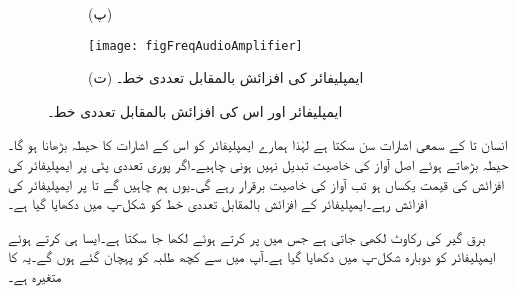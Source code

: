 \begin{figure}
\begin{subfigure}{1\textwidth}
\caption*{(پ)}
\end{subfigure}
\begin{subfigure}{1\textwidth}
\centering
\texttt{[image: figFreqAudioAmplifier]}
\caption*{(ت) ایمپلیفائر کی افزائش بالمقابل تعددی خط۔}
\end{subfigure}
\caption{ایمپلیفائر اور اس کی افزائش بالمقابل تعددی خط۔}
\label{شکل_تعددی_افزائش_بالمقابل_تعددی_خط}
\end{figure}
انسان  تا  کے سمعی اشارات سن سکتا ہے لہٰذا ہمارے ایمپلیفائر کو اس  کے اشارات کا حیطہ بڑھانا ہو گا۔حیطہ بڑھاتے ہوئے اصل آواز کی خاصیت تبدیل نہیں ہونی چاہیے۔اگر پوری تعددی پٹی پر ایمپلیفائر کی افزائش  کی قیمت یکساں ہو تب آواز کی خاصیت برقرار رہے گی۔یوں ہم چاہیں گے   تا  پر ایمپلیفائر کی افزائش   رہے۔ایمپلیفائر کے افزائش بالمقابل تعددی خط  کو شکل-پ میں دکھایا گیا ہے۔

برق گیر کی رکاوٹ  لکھی جاتی ہے جس میں  پر کرتے ہوئے  لکھا جا سکتا ہے۔ایسا ہی کرتے ہوئے ایمپلیفائر کو دوبارہ شکل-پ میں دکھایا گیا ہے۔آپ میں سے کچھ طلبہ  کو پہچان گئے ہوں گے۔یہ  کا متغیرہ ہے۔

